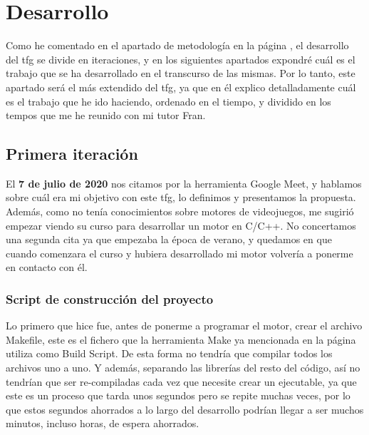 
\chapter{Desarrollo}
\label{desarrollo}

Como he comentado en el apartado de metodología en la página \pageref{metodologia}, el desarrollo del \gls{tfg} se divide en iteraciones, y en los siguientes apartados expondré cuál es el trabajo que se ha desarrollado en el transcurso de las mismas.
Por lo tanto, este apartado será el más extendido del \gls{tfg}, ya que en él explico detalladamente cuál es el trabajo que he ido haciendo, ordenado en el tiempo, y dividido en los tempos que me he reunido con mi tutor Fran.

\section{Primera iteración}
El \textbf{7 de julio de 2020} nos citamos por la herramienta Google Meet, y hablamos sobre cuál era mi objetivo con este \gls{tfg}, lo definimos y presentamos la propuesta. Además, como no tenía conocimientos sobre motores de videojuegos, me sugirió empezar viendo su curso para desarrollar un motor en C/C++. No concertamos una segunda cita ya que empezaba la época de verano, y quedamos en que cuando comenzara el curso y hubiera desarrollado mi motor volvería a ponerme en contacto con él.

\subsection{Script de construcción del proyecto}
Lo primero que hice fue, antes de ponerme a programar el motor, crear el archivo Makefile, este es el fichero que la herramienta Make ya mencionada en la página \pageref{herramientas} utiliza como Build Script. De esta forma no tendría que compilar todos los archivos uno a uno. Y además, separando las librerías del resto del código, así no tendrían que ser re-compiladas cada vez que necesite crear un ejecutable, ya que este es un proceso que tarda unos segundos pero se repite muchas veces, por lo que estos segundos ahorrados a lo largo del desarrollo podrían llegar a ser muchos minutos, incluso horas, de espera ahorrados.

